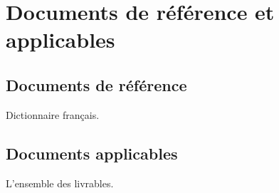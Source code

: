 
\section{Documents de référence et applicables}
    
    \subsection{Documents de référence}
        Dictionnaire français.
    \subsection{Documents applicables}
        L'ensemble des livrables.
